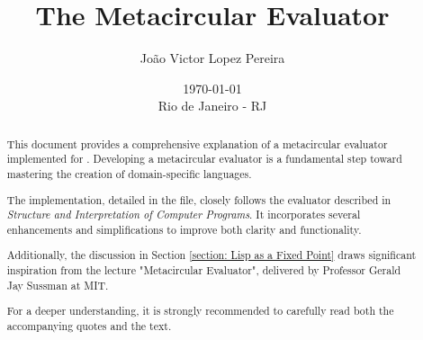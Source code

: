 \documentclass[a4paper, 11pt]{report}
\begin{document}
  \title{The Metacircular Evaluator}
  \date{\today \\ \vfill Rio de Janeiro - RJ}
  \author{João Victor Lopez Pereira}
  \maketitle \newpage
  \begin{abstract}

    This document provides a comprehensive explanation of a metacircular evaluator implemented for . Developing a metacircular evaluator is a fundamental step toward mastering the creation of domain-specific languages.

    The implementation, detailed in the  file, closely follows the evaluator described in \textit{Structure and Interpretation of Computer Programs}\cite{sicp}. It incorporates several enhancements and simplifications to improve both clarity and functionality.

    Additionally, the discussion in Section \ref{section: Lisp as a Fixed Point} draws significant inspiration from the lecture "Metacircular Evaluator"\cite{metacircular-lecture}, delivered by Professor Gerald Jay Sussman at MIT.

    For a deeper understanding, it is strongly recommended to carefully read both the accompanying quotes and the text.
  \end{abstract}
  \tableofcontents \newpage

  

  \newpage
  \nocite{*}
  \printbibliography
\end{document}
